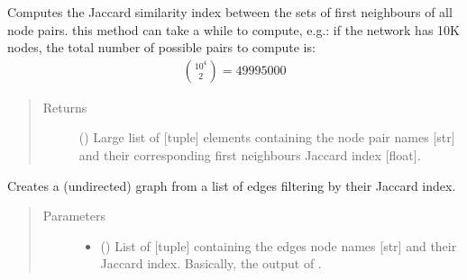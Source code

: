 \documentclass[letterpaper,10pt,english]{sphinxmanual}
\begin{document}
\begin{fulllineitems}
\begin{fulllineitems}
\begin{quote}
\begin{description}
\begin{itemize}
\end{itemize}

\end{description}\end{quote}

\end{fulllineitems}


\begin{fulllineitems}
\label{\detokenize{reference:pypath.main.PyPath.jaccard_edges}}
Computes the Jaccard similarity index between the sets of first
neighbours of all node pairs.  this method can take a
while to compute, e.g.: if the network has 10K nodes, the total
number of possible pairs to compute is:
\begin{equation*}
\begin{split}\binom{10^4}{2} = 49995000\end{split}
\end{equation*}\begin{quote}\begin{description}
\item[{Returns}] \leavevmode
() \textendash{} Large list of {[}tuple{]} elements containing the
node pair names {[}str{]} and their corresponding first
neighbours Jaccard index {[}float{]}.

\end{description}\end{quote}

\end{fulllineitems}


\begin{fulllineitems}
\label{\detokenize{reference:pypath.main.PyPath.jaccard_meta}}
Creates a (undirected) graph from a list of edges filtering by
their Jaccard index.
\begin{quote}\begin{description}
\item[{Parameters}] \leavevmode\begin{itemize}
\item {} 
 () \textendash{} List of {[}tuple{]} containing the edges node names {[}str{]} and
their Jaccard index. Basically, the output of
{\hyperref[\detokenize{reference:pypath.main.PyPath.jaccard_edges}]{}}.


\end{itemize}
\end{description}
\end{quote}
\end{fulllineitems}
\end{fulllineitems}
\end{document}
